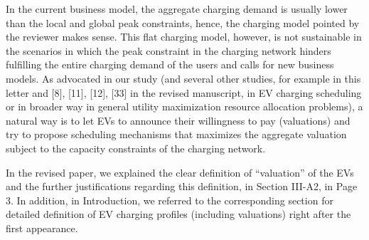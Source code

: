 \documentclass[11pt]{article}
\begin{document}
In the current business model, the aggregate charging demand is usually lower than the local and global peak constraints,  hence, the charging model pointed by the reviewer makes sense. This flat charging model, however, is not sustainable in the scenarios in which the peak constraint in the charging network hinders fulfilling the entire charging demand of the users and calls for new business models. As advocated in our study (and several other studies, for example \cite{robu2011online,gerding2011online,stein2012model}  in this letter and [8], [11], [12], [33] in the revised manuscript, in EV charging scheduling or in broader way in general utility maximization resource allocation problems), a natural way is to let EVs to announce their willingness to pay (valuations) and try to propose scheduling mechanisms that maximizes the aggregate valuation subject to the capacity constraints of the charging network.


 In the revised paper, we explained the clear definition of ``valuation'' of the EVs and the further justifications regarding this definition, in Section III-A2, in Page 3. In addition, in Introduction, we referred to the corresponding section for detailed definition of EV charging profiles (including valuations) right after the first appearance. 
 
\end{document}
